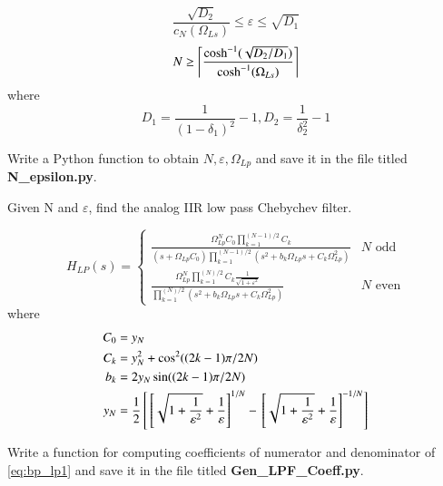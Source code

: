 \documentclass[journal,12pt,twocolumn]{IEEEtran}
\begin{document}
\solution
\begin{equation}
\frac{\sqrt{D_2}}{c_N(\Omega_{Ls})} \leq \varepsilon \leq \sqrt{D_1}
\end{equation}
\begin{equation}
N \geq  \ceil*{\frac{\cosh^{-1}(\sqrt{D_2/D_1})}{\cosh^{-1}(\Omega_{Ls})} }
\end{equation}
where
\begin{equation}
 D_1 =\frac{1}{(1-\delta_1)^2}-1 , D_2 = \frac{1}{\delta_2^2}-1
\end{equation}
\begin{problem}
Write a Python  function to obtain $N, \varepsilon, \Omega_{Lp}$ and save it in the file titled \textbf{N\_epsilon.py}.
\end{problem}
\solution 

%
\begin{problem}
Given N and $\varepsilon$, find the analog  IIR low pass Chebychev filter.
\end{problem}
\solution
\begin{equation} 
\label{eq:bp_lp1}
H_{LP}(s) =
\begin{cases}
\frac{\Omega_{Lp}^{N}C_0\prod_{k=1}^{(N-1)/2}C_k}{(s+\Omega_{Lp}C_0)\prod_{k=1}^{(N-1)/2}(s^2+b_k\Omega_{Lp}s+C_k\Omega_{Lp}^{2})} & N\text{ odd}
\\
\frac{\Omega_{Lp}^{N}\prod_{k=1}^{(N)/2}C_k\frac{1}{\sqrt{1+\varepsilon^2}}}{\prod_{k=1}^{(N)/2}(s^2+b_k\Omega_{Lp}s+C_k\Omega_{Lp}^{2})} & N\text{ even}
\end{cases}
\end{equation}
where
\begin{align}
C_0 &= y_N
\\
C_k &= y_N^2 + \cos^2((2k-1)\pi/2N)
\\
b_k &= 2y_{N}\sin((2k-1)\pi/2N)
\\
y_N &= \frac{1}{2}\sbrak{\sbrak{\sqrt{1+\frac{1}{\varepsilon^2}}+\frac{1}{\varepsilon}}^{1/N}-\sbrak{\sqrt{1+\frac{1}{\varepsilon^2}}+\frac{1}{\varepsilon}}^{-1/N}}
\end{align}
%
\begin{problem}
Write a function for computing coefficients of numerator and denominator of \eqref{eq:bp_lp1} and save it in the file titled \textbf{Gen\_LPF\_Coeff.py}.
\end{problem}
\end{document}
